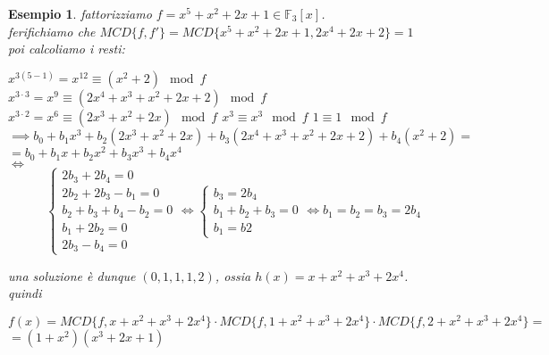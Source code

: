 \documentclass[a4paper,12pt]{article}
\theoremstyle{def}
\theoremstyle{prop}
\theoremstyle{esempio}
\newtheorem*{example}{Esempio}
\theoremstyle{dimostrazione}
\theoremstyle{teo}
\theoremstyle{osservazione}
\begin{document}
\begin{example}
    fattorizziamo \(f = x^5 + x^2 + 2x + 1 \in \mathbb{F}_3[x]\).\\
    ferifichiamo che \(MCD\{f, f'\} = MCD\{ x^5 + x^2 + 2x + 1, 2x^4 + 2x + 2\} = 1\)\\
    poi calcoliamo i resti:
    \begin{center}
        \(x^{3(5-1)} = x^{12} \equiv (x^2 + 2) \mod f\)
        \(x^{3\cdot3} = x^9 \equiv (2x^4 + x^3 + x^2 + 2x + 2) \mod f\)
        \(x^{3 \cdot 2} = x^6 \equiv (2x^3 + x^2 + 2x) \mod f\)
        \(x^3 \equiv x^3 \mod f\)
        \(1 \equiv 1 \mod f\)
        \(\implies b_0 + b_1 x^3 + b_2(2x^3 + x^2 + 2x) + b_3 (2x^4 + x^3 + x^2 + 2x + 2) + b_4(x^2 + 2) = \)\\
        \(= b_0 + b_1 x + b_2x^2 + b_3 x^3 + b_4 x^4\)\\
        \(\iff\) \[
        \begin{cases}
            2 b_3 + 2 b_4 = 0\\
            2 b_2 + 2 b_3 - b_1 = 0\\
            b_2 + b_3 + b_4 - b_2 = 0\\
            b_1 + 2 b_2 = 0\\
            2 b_3 - b_4 = 0
        \end{cases}
        \iff
        \begin{cases}
            b_3 = 2 b_4\\
            b_1 + b_2 + b_3 = 0\\
            b_1 = b2
        \end{cases}
        \iff
        b_1 = b_2 = b_3 = 2 b_4
        \]
    \end{center}
    una soluzione è dunque \((0, 1, 1, 1, 2)\), ossia \(h(x) =x + x^2 + x^3 +2 x^4\).\\
    quindi
    \begin{center}
        \(f(x) = MCD\{f, x + x^2 + x^3 +2 x^4\} \cdot MCD\{f, 1 + x^2 + x^3 +2 x^4\} \cdot MCD\{f, 2 + x^2 + x^3 + 2x^4\} = \)\\
        \(= (1 + x^2)(x^3 + 2x + 1)\)
    \end{center}
\end{example}
\end{document}
